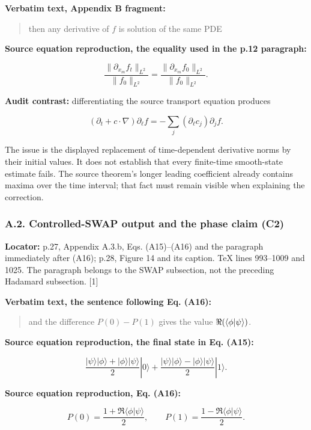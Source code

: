 \textbf{Verbatim text, Appendix B fragment:}

\begin{quote}
then any derivative of \(f\) is solution of the same PDE
\end{quote}

\textbf{Source equation reproduction, the equality used in the p.12
paragraph:}

\[
\frac{\|\partial_{x_m}f_t\|_{L^2}}{\|f_0\|_{L^2}}
=\frac{\|\partial_{x_m}f_0\|_{L^2}}{\|f_0\|_{L^2}}.
\]

\textbf{Audit contrast:} differentiating the source transport equation
produces

\[
(\partial_t+c\cdot\nabla)\partial_\ell f
=-\sum_j(\partial_\ell c_j)\partial_j f.
\]

The issue is the displayed replacement of time-dependent derivative
norms by their initial values. It does not establish that every
finite-time smooth-state estimate fails. The source theorem's longer
leading coefficient already contains maxima over the time interval; that
fact must remain visible when explaining the correction.

\subsubsection{A.2. Controlled-SWAP output and the phase claim
(C2)}\label{a.2.-controlled-swap-output-and-the-phase-claim-c2}

\textbf{Locator:} p.27, Appendix A.3.b, Eqs. (A15)--(A16) and the
paragraph immediately after (A16); p.28, Figure 14 and its caption. TeX
lines 993--1009 and 1025. The paragraph belongs to the SWAP subsection,
not the preceding Hadamard subsection. {[}1{]}

\textbf{Verbatim text, the sentence following Eq. (A16):}

\begin{quote}
and the difference \(P(0)-P(1)\) gives the value
\(\Re(\braket{\phi|\psi})\).
\end{quote}

\textbf{Source equation reproduction, the final state in Eq. (A15):}

\[
\frac{|\psi\rangle|\phi\rangle+|\phi\rangle|\psi\rangle}{2}|0\rangle
+\frac{|\psi\rangle|\phi\rangle-|\phi\rangle|\psi\rangle}{2}|1\rangle.
\]

\textbf{Source equation reproduction, Eq. (A16):}

\[
P(0)=\frac{1+\Re\langle\phi|\psi\rangle}{2},\qquad
P(1)=\frac{1-\Re\langle\phi|\psi\rangle}{2}.
\]

